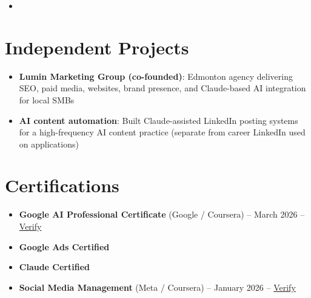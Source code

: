\documentclass[11pt,a4paper,sans]{moderncv}
\begin{document}
\begin{itemize}
\item{}

\end{itemize}

\section{Independent Projects}
\vspace{1pt}
\begin{itemize}
\item \textbf{Lumin Marketing Group (co-founded)}: Edmonton agency delivering SEO, paid media, websites, brand presence, and Claude-based AI integration for local SMBs
\item \textbf{AI content automation}: Built Claude-assisted LinkedIn posting systems for a high-frequency AI content practice (separate from career LinkedIn used on applications)
\end{itemize}

\section{Certifications}
\vspace{1pt}
\begin{itemize}
\item \textbf{Google AI Professional Certificate} (Google / Coursera) -- March 2026 -- \href{https://www.coursera.org/account/accomplishments/verify/professional-cert/54E1P3RBHVL8}{Verify}
\item \textbf{Google Ads Certified}
\item \textbf{Claude Certified}
\item \textbf{Social Media Management} (Meta / Coursera) -- January 2026 -- \href{https://www.coursera.org/account/accomplishments/verify/7NOVGMU2L69G}{Verify}
\end{itemize}
\end{document}
